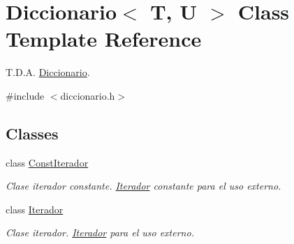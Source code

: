\hypertarget{classDiccionario}{}\section{Diccionario$<$ T, U $>$ Class Template Reference}
\label{classDiccionario}


T.\+D.\+A. \hyperlink{classDiccionario}{Diccionario}.  




{\ttfamily \#include $<$diccionario.\+h$>$}

\subsection*{Classes}
\begin{DoxyCompactItemize}
\item 
class \hyperlink{classDiccionario_1_1ConstIterador}{Const\+Iterador}
\begin{DoxyCompactList}\small\item\em Clase iterador constante. \hyperlink{classDiccionario_1_1Iterador}{Iterador} constante para el uso externo. \end{DoxyCompactList}\item 
class \hyperlink{classDiccionario_1_1Iterador}{Iterador}
\begin{DoxyCompactList}\small\item\em Clase iterador. \hyperlink{classDiccionario_1_1Iterador}{Iterador} para el uso externo. \end{DoxyCompactList}\end{DoxyCompactItemize}
